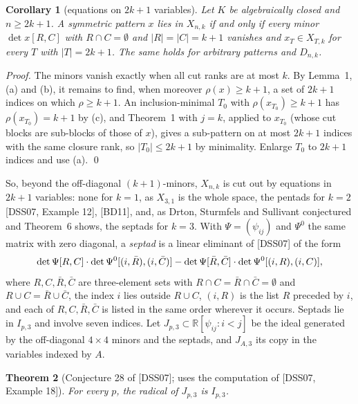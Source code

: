 \documentclass[11pt,letterpaper,reqno]{amsart}
\theoremstyle{spaced}
\newtheorem{theorem}{Theorem}
\newtheorem{corollary}[theorem]{Corollary}
\begin{document}
\begin{corollary}[equations on \(2k+1\) variables]
Let \(K\) be algebraically closed and \(n \ge 2k+1\). A symmetric pattern \(x\) lies in \(X_{n,k}\) if and only if every minor \(\det x[R, C]\) with \(R \cap C = \emptyset\) and \(\lvert R\rvert = \lvert C\rvert = k+1\) vanishes and \(x_T \in X_{T,k}\) for every \(T\) with \(\lvert T\rvert = 2k+1\). The same holds for arbitrary patterns and \(D_{n,k}\).
\end{corollary}

\emph{Proof.} The minors vanish exactly when all cut ranks are at most \(k\). By Lemma~1, (a) and (b), it remains to find, when moreover \(\rho(x) \ge k+1\), a set of \(2k+1\) indices on which \(\rho \ge k+1\). An inclusion-minimal \(T_0\) with \(\rho(x_{T_0}) \ge k+1\) has \(\rho(x_{T_0}) = k+1\) by (c), and Theorem~1 with \(j = k\), applied to \(x_{T_0}\) (whose cut blocks are sub-blocks of those of \(x\)), gives a sub-pattern on at most \(2k+1\) indices with the same closure rank, so \(\lvert T_0\rvert \le 2k+1\) by minimality. Enlarge \(T_0\) to \(2k+1\) indices and use (a). \qed

\begingroup{} So, beyond the off-diagonal \((k+1)\)-minors, \(X_{n,k}\) is cut out by equations in \(2k+1\) variables: none for \(k = 1\), as \(X_{3,1}\) is the whole space, the pentads for \(k = 2\) {[}DSS07, Example 12{]}, {[}BD11{]}, and, as Drton, Sturmfels and Sullivant conjectured and Theorem~6 shows, the septads for \(k = 3\). With \(\Psi = (\psi_{ij})\) and \(\Psi^0\) the same matrix with zero diagonal, a \emph{septad} is a linear eliminant of {[}DSS07{]} of the form
\[\det \Psi[R, C] \cdot \det \Psi^0[(i, \bar R), (i, \bar C)] - \det \Psi[\bar R, \bar C] \cdot \det \Psi^0[(i, R), (i, C)],\postdisplaypenalty=10000 \]
where \(R, C, \bar R, \bar C\) are three-element sets with \(R \cap C = \bar R \cap \bar C = \emptyset\) and \(R \cup C = \bar R \cup \bar C\), the index \(i\) lies outside \(R \cup C\), \((i, R)\) is the list \(R\) preceded by \(i\), and each of \(R, C, \bar R, \bar C\) is listed in the same order wherever it occurs. Septads lie in \(I_{p,3}\) and involve seven indices. Let \(J_{p,3} \subset \mathbb{R}[\psi_{ij} : i < j]\) be the ideal generated by the off-diagonal \(4 \times 4\) minors and the septads, and \(J_{A,3}\) its copy in the variables indexed by \(A\).\par\endgroup

\begin{theorem}[Conjecture 28 of {[}DSS07{]}; uses the computation of {[}DSS07, Example 18{]}]
For every \(p\), the radical of \(J_{p,3}\) is \(I_{p,3}\).
\end{theorem}
\end{document}

